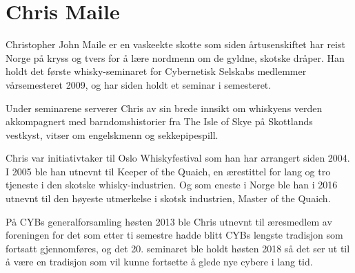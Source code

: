 \chapter{Chris Maile}

\author{Skrevet av Torgeir Lebesbye}

Christopher John Maile er en vaskeekte skotte som siden årtusenskiftet har reist Norge på kryss og tvers for å lære nordmenn om de gyldne, skotske dråper. Han holdt det første whisky-seminaret for Cybernetisk Selskabs medlemmer vårsemesteret 2009, og har siden holdt et seminar i semesteret.

Under seminarene serverer Chris av sin brede innsikt om whiskyens verden akkompagnert med barndomshistorier fra The Isle of Skye på Skottlands vestkyst, vitser om engelskmenn og sekkepipespill.

Chris var initiativtaker til Oslo Whiskyfestival som han har arrangert siden 2004. I 2005 ble han utnevnt til Keeper of the Quaich, en ærestittel for lang og tro tjeneste i den skotske whisky-industrien. Og som eneste i Norge ble han i 2016 utnevnt til den høyeste utmerkelse i skotsk industrien, Master of the Quaich.

På CYBs generalforsamling høsten 2013 ble Chris utnevnt til æresmedlem av foreningen for det som etter ti semestre hadde blitt CYBs lengste tradisjon som fortsatt gjennomføres, og det 20. seminaret ble holdt høsten 2018 så det ser ut til å være en tradisjon som vil kunne fortsette å glede nye cybere i lang tid.
